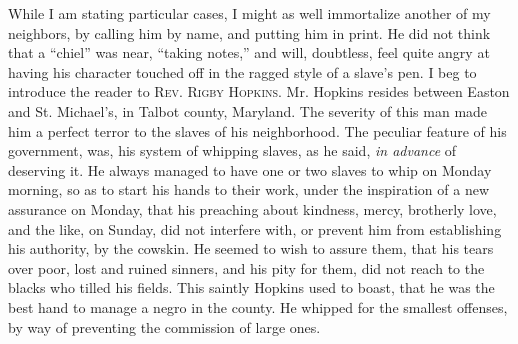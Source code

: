 While I am stating particular cases, I might as well immortalize another
of my neighbors, by calling him by name, and putting him in print. He
did not think that a ``chiel'' was near, ``taking notes,'' and will,
doubtless, feel quite angry at having his character touched off in the
ragged style of a slave's pen. I beg to introduce the reader to
\textsc{Rev. Rigby Hopkins}. Mr. Hopkins resides between Easton and St.
Michael's, in Talbot county, Maryland. The severity of this man made him
a perfect terror to the slaves of his neighborhood. The peculiar feature
of his government, was, his system of whipping slaves, as he said,
\emph{in advance} of deserving it. He always managed to have one or two
slaves to whip on Monday morning, so as to start his hands to their
work, under the inspiration of a new assurance on Monday, that his
preaching about kindness, mercy, brotherly love, and the like, on
Sunday, did not interfere with, or prevent him from establishing his
authority, by the cowskin. He seemed to wish to assure them, that his
tears over poor, lost and ruined sinners, and his pity for them, did not
reach to the blacks who tilled his fields. This saintly Hopkins used to
boast, that he was the best hand to manage a negro in the county. He
whipped for the smallest offenses, by way of preventing the commission
of large ones.

